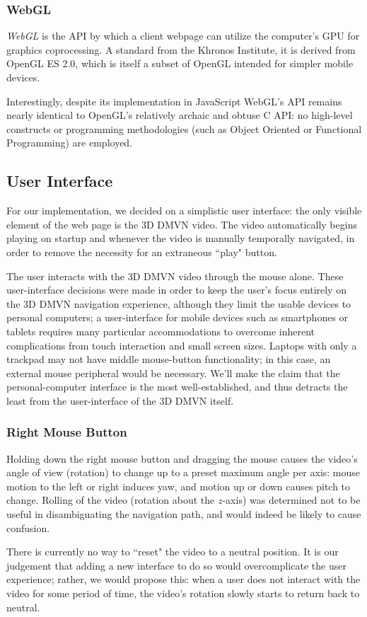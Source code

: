 \subsubsection{WebGL}
\emph{WebGL} is the API by which a client webpage can utilize the computer's GPU for graphics coprocessing. A standard from the Khronos Institute, it is derived from OpenGL ES 2.0, which is itself a subset of OpenGL intended for simpler mobile devices.\cite{webgl} \par
Interestingly, despite its implementation in JavaScript WebGL's API remains nearly identical to OpenGL's relatively archaic and obtuse C API: no high-level constructs or programming methodologies (such as Object Oriented or Functional Programming) are employed.

\subsection{User Interface}
\label{ui}
For our implementation, we decided on a simplistic user interface: the only visible element of the web page is the 3D DMVN video. The video automatically begins playing on startup and whenever the video is manually temporally navigated, in order to remove the necessity for an extraneous ``play" button.
\par The user interacts with the 3D DMVN video through the mouse alone. These user-interface decisions were made in order to keep the user's focus entirely on the 3D DMVN navigation experience, although they limit the usable devices to personal computers; a user-interface for mobile devices such as smartphones or tablets requires many particular accommodations to overcome inherent complications from touch interaction and small screen sizes. Laptops with only a trackpad may not have middle mouse-button functionality; in this case, an external mouse peripheral would be necessary. We'll make the claim that the personal-computer interface is the most well-established, and thus detracts the least from the user-interface of the 3D DMVN itself.

\subsubsection{Right Mouse Button}
\label{uirmb}
Holding down the right mouse button and dragging the mouse causes the video's angle of view (rotation) to change up to a preset maximum angle per axis: mouse motion to the left or right induces yaw, and motion up or down causes pitch to change. Rolling of the video (rotation about the $z$-axis) was determined not to be useful in disambiguating the navigation path, and would indeed be likely to cause confusion.
\par There is currently no way to ``reset" the video to a neutral position. It is our judgement that adding a new interface to do so would overcomplicate the user experience; rather, we would propose this: when a user does not interact with the video for some period of time, the video's rotation slowly starts to return back to neutral.
\par 

